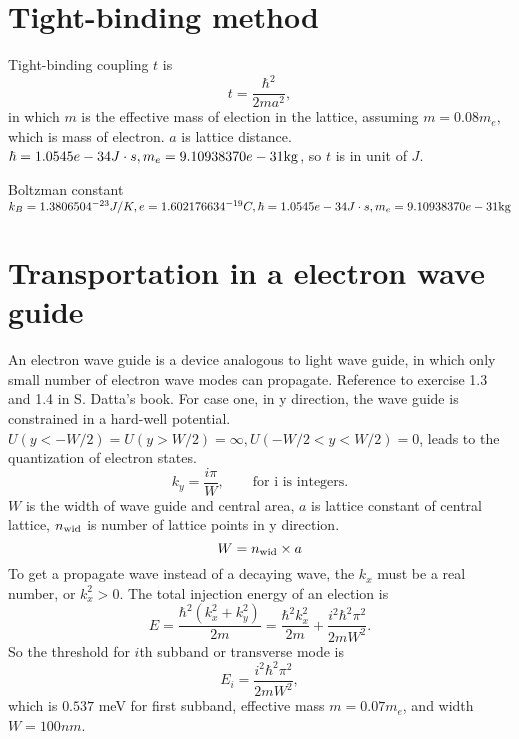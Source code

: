 \documentclass[11pt,a4paper]{article}
\begin{document}
\section{Tight-binding method}
Tight-binding coupling $t$ is 
\[
t = \frac{\hbar^{2}}{2ma^{2}},
\]
in which $m$ is the effective mass of election in the lattice, assuming $m=0.08m_{e}$, which is mass of electron. $a$ is lattice distance. $\hbar = 1.0545e-34J\cdot s, m_e = 9.10938370e-31\rm{kg}$, so $t$ is in unit of $J$.

Boltzman constant $k_B = 1.3806504^{-23}J/K, e = 1.602176634^{-19}C, \hbar = 1.0545e-34J\cdot s, m_e = 9.10938370e-31\rm{kg}$


\section{Transportation in a electron wave guide}
An electron wave guide is a device analogous to light wave guide, in which only small number of electron wave modes can propagate. Reference to exercise 1.3 and 1.4 in S. Datta's book. For case one, in y direction, the wave guide is constrained in a hard-well potential. $U(y < -W/2) = U(y > W/2) = \infty, U(-W/2 < y < W/2) = 0$, leads to the quantization of electron states.
\begin{equation}
k_{y} = \frac{i\pi}{W}, \qquad \text{for i is integers.}
\end{equation}
$W$ is the width of wave guide and central area, $a$ is lattice constant of central lattice, $n_{\rm{wid}}$ is number of lattice points in y direction.
\begin{equation}
W = n_{\rm{wid}}\times a
\end{equation}
To get a propagate wave instead of a decaying wave, the $k_{x}$ must be a real number, or $k_{x}^{2} > 0$. The total injection energy of an election is
\begin{equation}
E = \frac{\hbar^{2} (k_{x}^{2}+k_{y}^{2})}{2m} = \frac{\hbar^{2} k_{x}^{2}}{2m} + \frac{i^{2}\hbar^{2} \pi^{2}}{2mW^{2}}.
\end{equation}
So the threshold for $i$th subband or transverse mode is
\begin{equation}
E_{i} = \frac{i^{2}\hbar^{2} \pi^{2}}{2mW^{2}},
\end{equation}
which is $0.537$ meV for first subband, effective mass $m=0.07m_{e}$, and width $W = 100nm$.
\end{document}
